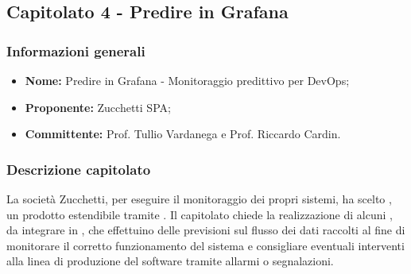 
\subsection{Capitolato 4 - Predire in Grafana}

		\subsubsection{Informazioni generali}
			\begin{itemize} %
			  \item \textbf{Nome:} Predire in Grafana - Monitoraggio predittivo per DevOps;
			  \item \textbf{Proponente:} Zucchetti SPA;
				\item \textbf{Committente: }Prof. Tullio Vardanega e Prof. Riccardo Cardin.
			\end{itemize}

		\subsubsection{Descrizione capitolato}
			La società Zucchetti, per eseguire il monitoraggio dei propri sistemi, ha scelto , un prodotto  estendibile tramite .
			Il capitolato chiede la realizzazione di alcuni , da integrare in , che effettuino delle previsioni sul flusso dei dati raccolti al fine di monitorare il corretto funzionamento del sistema e consigliare eventuali interventi alla linea di produzione del software tramite allarmi o segnalazioni.

